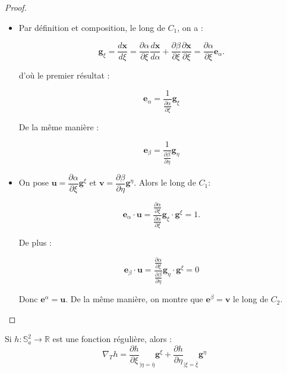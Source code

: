 \begin{proof}
\begin{itemize}
\item Par définition et composition, le long de $C_1$, on a :

\begin{equation}
\mathbf{g}_{\xi} = \dfrac{d \mathbf{x}}{d \xi} = \dfrac{\partial \alpha}{\partial \xi} \dfrac{d \mathbf{x}}{d \alpha} + \dfrac{\partial \beta}{\partial \xi} \dfrac{\partial \mathbf{x}}{\partial \xi}= \dfrac{\partial \alpha}{\partial \xi} \mathbf{e}_{\alpha}.
\end{equation}

d'où le premier résultat :

\begin{equation}
\mathbf{e}_{\alpha} = \dfrac{1}{\frac{\partial \alpha}{\partial \xi}} \mathbf{g}_{\xi}
\end{equation}

De la même manière :

\begin{equation}
\mathbf{e}_{\beta} = \dfrac{1}{\frac{\partial \beta}{\partial \eta}} \mathbf{g}_{\eta}
\end{equation}

\item On pose $\mathbf{u} = \dfrac{\partial \alpha}{\partial \xi} \mathbf{g}^{\xi}$ et $\mathbf{v} = \dfrac{\partial \beta}{\partial \eta} \mathbf{g}^{\eta}$. Alors le long de $C_1$:

\begin{equation}
\mathbf{e}_{\alpha} \cdot \mathbf{u} = \dfrac{\frac{\partial \alpha}{\partial \xi}}{\frac{\partial \alpha}{\partial \xi}} \mathbf{g}_{\xi} \cdot \mathbf{g}^{\xi} = 1.
\end{equation}

De plus :

\begin{equation}
\mathbf{e}_{\beta} \cdot \mathbf{u} = \dfrac{\frac{\partial \alpha}{\partial \xi}}{\frac{\partial \beta}{\partial \eta}} \mathbf{g}_{\eta} \cdot \mathbf{g}^{\xi} = 0
\end{equation}

Donc $\mathbf{e}^{\alpha} = \mathbf{u}$. De la même manière, on montre que $\mathbf{e}^{\beta} = \mathbf{v}$ le long de $C_2$.
\end{itemize}
\end{proof}




\begin{theoreme}
Si $h : \mathbb{S}_a^2 \rightarrow \mathbb{R}$ est une fonction régulière, alors :
\begin{equation}
\nabla_T h = \dfrac{\partial h}{\partial \xi}_{|\eta = \bar{\eta}} \mathbf{g}^{\xi} + \dfrac{\partial h}{\partial \eta}_{|\xi = \bar{\xi}} \mathbf{g}^{\eta}
\end{equation}
\label{th:gradient_xieta}
\end{theoreme}


